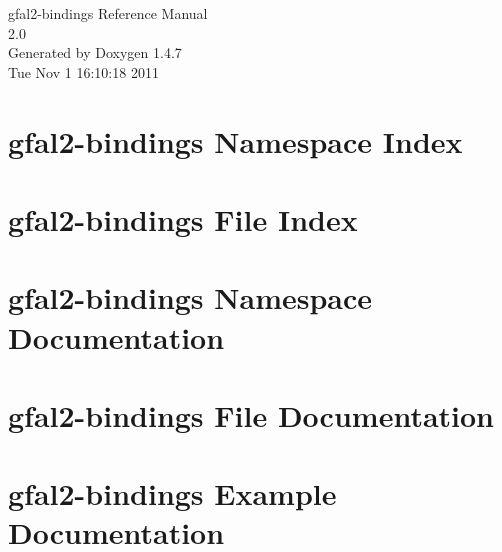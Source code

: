 \documentclass[a4paper]{book}
\begin{document}
\begin{titlepage}
\vspace*{7cm}
\begin{center}
{\Large gfal2-bindings Reference Manual\\[1ex]\large 2.0 }\\
\vspace*{1cm}
{\large Generated by Doxygen 1.4.7}\\
\vspace*{0.5cm}
{\small Tue Nov 1 16:10:18 2011}\\
\end{center}
\end{titlepage}
\clearemptydoublepage
{}
\tableofcontents
\clearemptydoublepage
{}
\chapter{gfal2-bindings Namespace Index}

\chapter{gfal2-bindings File Index}

\chapter{gfal2-bindings Namespace Documentation}

\chapter{gfal2-bindings File Documentation}

\chapter{gfal2-bindings Example Documentation}


\printindex
\end{document}
